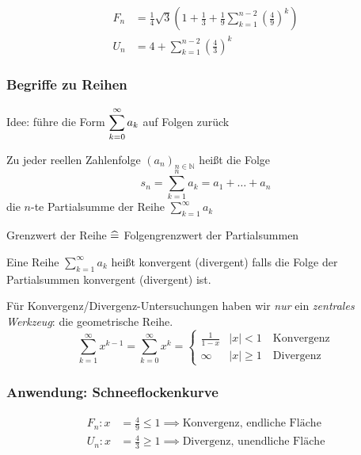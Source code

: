 \begin{align*}
    F_n &= \frac{1}{4} \sqrt{3} \left( 1 + \frac{1}{3} + \frac{1}{9} \sum_{k=1}^{n-2} \left( \frac{4}{9} \right)^k \right) \\
    U_n &= 4 + \sum_{k=1}^{n-2} \left( \frac{4}{3} \right)^k
\end{align*}

\subsubsection*{Begriffe zu Reihen}

Idee: führe die Form $\displaystyle\sum_{k=0}^{\infty} a_k$ auf Folgen zurück

\begin{definition}[Partialsumme] Zu jeder reellen Zahlenfolge $(a_n)_{n \in \mathbb{N}}$ heißt die Folge
\begin{equation*}
    s_n = \sum_{k=1}^n a_k = a_1 + \dots + a_n
\end{equation*}
die $n$-te Partialsumme der Reihe $\sum_{k=1}^{\infty} a_k$
\end{definition}

\noindent Grenzwert der Reihe $\mathrel{\widehat{=}}$ Folgengrenzwert der Partialsummen

\begin{definition}
Eine Reihe $\sum_{k=1}^{\infty} a_k$ heißt konvergent (divergent) falls die Folge der Partialsummen konvergent (divergent) ist.
\end{definition}

\noindent Für Konvergenz/Divergenz-Untersuchungen haben wir \emph{nur} ein \emph{zentrales Werkzeug}: die geometrische Reihe.
\begin{equation*}
    \sum_{k=1}^{\infty} x^{k-1} = \sum_{k=0}^{\infty} x^k =
    \begin{cases}
        \frac{1}{1-x} & |x| < 1 \quad\text{Konvergenz}\\
        \infty & |x| \geq 1 \quad\text{Divergenz}
    \end{cases}
\end{equation*}

\subsubsection*{Anwendung: Schneeflockenkurve}
\begin{align*}
    F_n: x &= \frac{4}{9} \le 1 \implies \text{Konvergenz, endliche Fläche} \\
    U_n: x &= \frac{4}{3} \ge 1 \implies \text{Divergenz, unendliche Fläche}
\end{align*}

